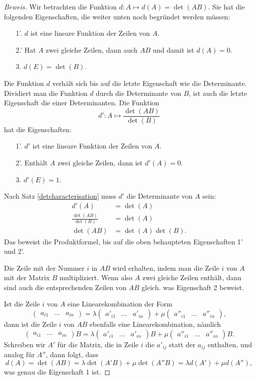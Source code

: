 \begin{proof}[Beweis]
Wir betrachten die Funktion $d\colon A\mapsto d(A) = \det(AB)$.
Sie hat die folgenden Eigenschaften, die weiter unten noch
begründet werden müssen:
\begin{enumerate}
\item[1'.] $d$ ist eine lineare Funktion der Zeilen von $A$.
\item[2.']
Hat $A$ zwei gleiche Zeilen, dann auch $AB$ und damit ist $d(A)=0$.
\item[3.]
$d(E)=\det(B)$.
\end{enumerate}
Die Funktion $d$ verhält sich bis auf die letzte Eigenschaft
wie die Determinante.
Dividiert man die Funktion $d$ durch die Determinante
von $B$, ist auch die letzte Eigenschaft die einer Determinanten.
Die Funktion
\[
d':A\mapsto \frac{\det(AB)}{\det(B)}
\]
hat die Eigenschaften:
\begin{enumerate}
\item[1'.] $d'$ ist eine lineare Funktion der Zeilen von $A$.
\item[2'.] Enthält $A$ zwei gleiche Zeilen, dann ist $d'(A)=0$.
\item[3.] $d'(E)=1$.
\end{enumerate}
Nach Satz \ref{detcharacterisation} muss $d'$ die Determinante von $A$ sein:
\begin{align*}
d'(A)&=\det(A)\\
\frac{\det(AB)}{\det(B)}&=\det(A)\\
\det(AB)&=\det(A)\det(B).
\end{align*}
Das beweist die Produktformel, bis auf die oben behaupteten Eigenschaften
1' und 2'.

Die Zeile mit der Nummer $i$ in $AB$ wird erhalten,
indem man die Zeile $i$ von $A$
mit der Matrix $B$ multipliziert.
Wenn also $A$ zwei gleiche Zeilen enthält, dann sind auch die
entsprechenden Zeilen von $AB$ gleich.
was Eigenschaft 2 beweist.

Ist die Zeile $i$ von $A$ eine Linearekombination der Form
\[
\begin{pmatrix}
a_{i1}&\dots&a_{in}
\end{pmatrix}
=
\lambda
\begin{pmatrix}
a'_{i1} &\dots &a'_{in}
\end{pmatrix}
+
\mu
\begin{pmatrix}
a''_{i1} &\dots &a''_{in}
\end{pmatrix},
\]
dann ist die Zeile $i$ von $AB$ ebenfalls eine Linearekombination,
nämlich
\[
\begin{pmatrix}
a_{i1}&\dots&a_{in}
\end{pmatrix}B
=
\lambda
\begin{pmatrix}
a'_{i1} &\dots &a'_{in}
\end{pmatrix}B
+
\mu
\begin{pmatrix}
a''_{i1} &\dots &a''_{in}
\end{pmatrix}B.
\]
Schreiben wir $A'$ für die Matrix, die in Zeile $i$ die $a'_{ij}$
statt der $a_{ij}$ enthalten, und analog für $A''$, dann folgt, dass
\[
d(A) = \det(AB)=\lambda \det(A'B)+\mu\det(A''B)=\lambda d(A') + \mu d(A''),
\]
was genau die Eigenschaft 1 ist.
\end{proof}

